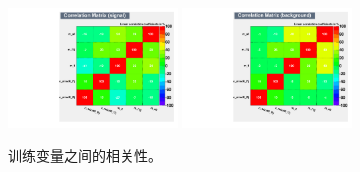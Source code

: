\begin{figure}[h]
\centering
\includegraphics[width = 0.4\textwidth,angle=-90]{fig/SigOpt/correlation_signal.pdf}
\includegraphics[width = 0.4\textwidth,angle=-90]{fig/SigOpt/correlation_bkg.pdf}
\caption{训练变量之间的相关性。}
\label{fig:correlation_check}
\end{figure}

